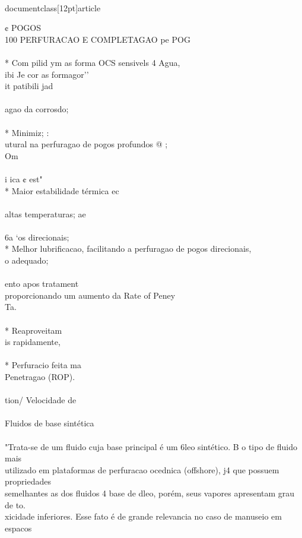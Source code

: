 \\documentclass[12pt]{article}
\begin{document}
¢ POGOS\\
100 PERFURACAO E COMPLETAGAO pe POG\\
\\
* Com pilid ym as forma OCS sensivels 4 Agua,\\
ibi Je cor as formagor’’\\
it patibili jad\\
\\
agao da corrosdo;\\
\\
* Minimiz; :\\
utural na perfuragao de pogos profundos @ ;\\
Om\\
\\
i ica ¢ est"\\
* Maior estabilidade térmica ec\\
\\
altas temperaturas; ae\\
\\
6a ‘os direcionais;\\
* Melhor lubrificacao, facilitando a perfuragao de pogos direcionais,\\
o adequado;\\
\\
ento apos tratament\\
proporcionando um aumento da Rate of Peney\\
Ta.\\
\\
* Reaproveitam\\
is rapidamente,\\
\\
* Perfuracio feita ma\\
Penetragao (ROP).\\
\\
tion/ Velocidade de\\
\\
Fluidos de base sintética\\
\\
"Trata-se de um fluido cuja base principal é um 6leo sintético. B o tipo de fluido mais\\
utilizado em plataformas de perfuracao ocednica (offshore), j4 que possuem propriedades\\
semelhantes as dos fluidos 4 base de dleo, porém, seus vapores apresentam grau de to.\\
xicidade inferiores. Esse fato é de grande relevancia no caso de manuseio em espacos\\
\end{document}

